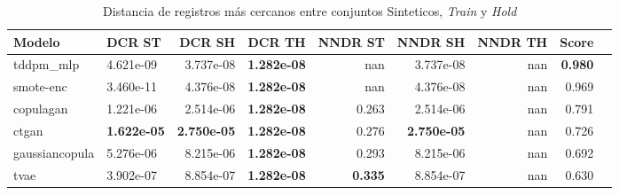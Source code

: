 \begin{table}[H]
\centering
\caption{Distancia de registros más cercanos entre conjuntos Sinteticos, \emph{Train} y \emph{Hold}}
\label{table-dcr-economicos-a-2}
\begin{tabular}{|l|l|r|r|r|r|r|r|r|}
\hline
\rowcolor[gray]{0.8}
Modelo & DCR ST & DCR SH & DCR TH & NNDR ST & NNDR SH & NNDR TH & \textbf{Score} \\
\hline tddpm\_mlp & 4.621e-09 & \cellcolor[rgb]{0.9, 0.54, 0.52} 3.737e-08 & \bfseries 1.282e-08 & nan & 3.737e-08 & nan & \bfseries 0.980 \\
\hline smote-enc & \cellcolor[rgb]{0.9, 0.54, 0.52} 3.460e-11 & 4.376e-08 & \bfseries 1.282e-08 & nan & 4.376e-08 & nan & 0.969 \\
\hline copulagan & 1.221e-06 & 2.514e-06 & \bfseries 1.282e-08 & 0.263 & 2.514e-06 & nan & 0.791 \\
\hline ctgan & \bfseries 1.622e-05 & \bfseries 2.750e-05 & \bfseries 1.282e-08 & 0.276 & \bfseries 2.750e-05 & nan & 0.726 \\
\hline gaussiancopula & 5.276e-06 & 8.215e-06 & \bfseries 1.282e-08 & 0.293 & 8.215e-06 & nan & 0.692 \\
\hline tvae & 3.902e-07 & 8.854e-07 & \bfseries 1.282e-08 & \bfseries 0.335 & 8.854e-07 & nan & 0.630 \\
\hline
\end{tabular}
\end{table}
